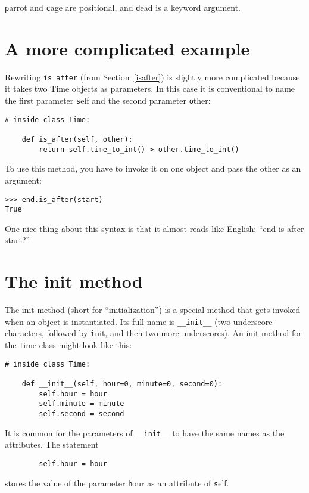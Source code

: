 \documentclass[
DIV=11,
fontsize=13,
twoside,
headinclude=false,
titlepage=firstiscover,
abstract=true,
headsepline=true,
footsepline=true,
chapterprefix=true, %
headings=big,
bibliography=totoc,%
captions=tableheading
]{scrbook}
\theoremstyle{definition}
\begin{document}
{\texttt parrot} and {\texttt cage} are positional, and {\texttt dead} is
a keyword argument.


\section{A more complicated example}

Rewriting \verb"is_after" (from Section~\ref{isafter}) is slightly
more complicated because it takes two Time objects as parameters.  In
this case it is conventional to name the first parameter {\texttt self}
and the second parameter {\texttt other}: 

\begin{lstlisting}
# inside class Time:

    def is_after(self, other):
        return self.time_to_int() > other.time_to_int()
\end{lstlisting}
%
To use this method, you have to invoke it on one object and pass
the other as an argument:

\begin{lstlisting}
>>> end.is_after(start)
True
\end{lstlisting}
%
One nice thing about this syntax is that it almost reads
like English: ``end is after start?''


\section{The init method}

The init method (short for ``initialization'') is
a special method that gets invoked when an object is instantiated.  
Its full name is \verb"__init__" (two underscore characters,
followed by {\texttt init}, and then two more underscores).  An
init method for the {\texttt Time} class might look like this:

\begin{lstlisting}
# inside class Time:

    def __init__(self, hour=0, minute=0, second=0):
        self.hour = hour
        self.minute = minute
        self.second = second
\end{lstlisting}
%
It is common for the parameters of \verb"__init__"
to have the same names as the attributes.  The statement

\begin{lstlisting}
        self.hour = hour
\end{lstlisting}
%
stores the value of the parameter {\texttt hour} as an attribute
of {\texttt self}.
\end{document}
